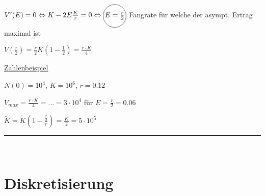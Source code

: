 \documentclass[18pt,a4paper]{scrreprt}
\newcommand*\circled[1]{\tikz[baseline=(char.base)]{
            \node[shape=circle,draw,inner sep=1pt] (char) {#1};}}
\begin{document}
$V'(E) = 0 \Leftrightarrow K - 2E \frac{K}{r} = 0 \Leftrightarrow \circled{$E = \frac{r}{2}$}$ Fangrate für welche der asympt. Ertrag maximal ist

$V(\frac{r}{2}) = \frac{r}{2} K (1- \frac{1}{2}) = \frac{r\cdot K}{4}$ 

\uline{Zahlenbeispiel}

$N(0) = 10^4$, $K = 10^6$, $r = 0.12$

$V_{max} = \frac{r\cdot K}{4} = ... = 3\cdot 10^4$ für $E = \frac{r}{2} = 0.06$

$\tilde{K} = K(1-\frac{\frac{r}{2}}{r}) = \frac{K}{2} = 5\cdot 10^5$

\rule{\textwidth}{0.4mm}\\

\section{Diskretisierung}
\end{document}
